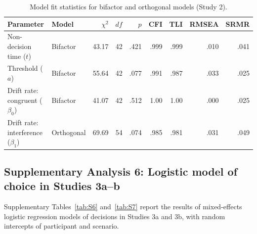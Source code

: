 \documentclass[pdflatex,sn-nature]{sn-jnl}
\begin{document}
\begin{appendices}
\begin{table}[h]
\caption{Model fit statistics for bifactor and orthogonal models (Study 2).}
\label{tab:S5}
\begin{tabular*}{\textwidth}{@{\extracolsep{\fill}}llrrrrrrr@{}}
\toprule
Parameter & Model & $\chi^2$ & $df$ & $p$ & CFI & TLI & RMSEA & SRMR \\
\midrule
Non-decision time ($t$)       & Bifactor           & 43.17 & 42 & .421 & .999 & .999 & .010 & .041 \\
Threshold ($a$)               & Bifactor           & 55.64 & 42 & .077 & .991 & .987 & .033 & .025 \\
Drift rate: congruent ($\beta_0$) & Bifactor       & 41.07 & 42 & .512 & 1.00 & 1.00 & .000 & .025 \\
Drift rate: interference ($\beta_1$) & Orthogonal  & 69.69 & 54 & .074 & .985 & .981 & .031 & .049 \\
\bottomrule
\end{tabular*}
\end{table}


\clearpage

\FloatBarrier

\subsection*{Supplementary Analysis 6: Logistic model of choice in Studies 3a--b}
\label{supp:analysis6}

Supplementary Tables~\ref{tab:S6} and~\ref{tab:S7} report the results of mixed-effects logistic regression models of decisions in Studies 3a and 3b, with random intercepts of participant and scenario.


\end{appendices}
\end{document}
